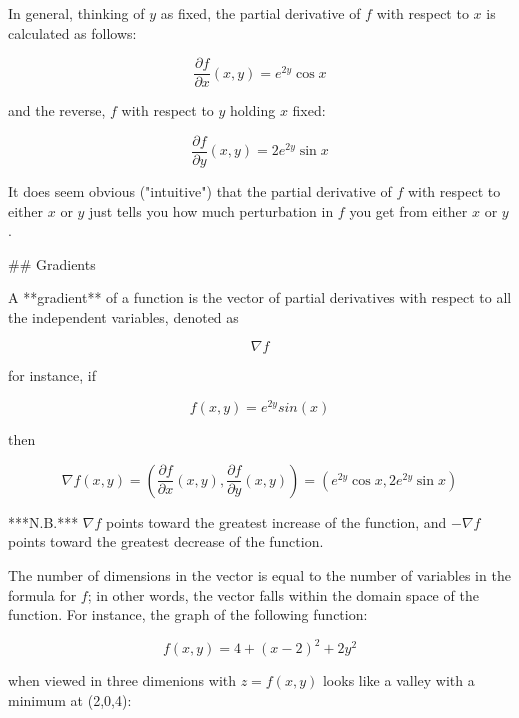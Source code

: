 \begin{markdown}
In general, thinking of $y$ as fixed, the partial derivative of $f$ with respect
to $x$ is calculated as follows:

\begin{equation}
    \frac{\partial f}{\partial x}(x,y) = e^{2y}\cos{x}
\end{equation}

and the reverse, $f$ with respect to $y$ holding $x$ fixed:

\begin{equation}
    \frac{\partial f}{\partial y}(x,y) = 2e^{2y}\sin{x}
\end{equation}

It does seem obvious ("intuitive") that the partial derivative of $f$ with
respect to either $x$ or $y$ just tells you how much perturbation in $f$ you get
from either $x$ or $y$.

## Gradients

A **gradient** of a function is the vector of partial derivatives with respect
to all the independent variables, denoted as

\begin{equation}
    \nabla f
\end{equation}

for instance, if

\begin{equation}
    f(x,y) = e^{2y}sin(x)
\end{equation}

then

\begin{equation}
    \nabla f(x,y) =
    \left( \frac{\partial f}{\partial x}(x,y), \frac{\partial f}{\partial y}(x,y) \right) =
    (e^{2y}\cos{x}, 2e^{2y}\sin{x})
\end{equation}

***N.B.*** $\nabla f$ points toward the greatest increase of the function, and
$-\nabla f$ points toward the greatest decrease of the function.

The number of dimensions in the vector is equal to the number of variables in
the formula for $f$; in other words, the vector falls within the domain space of
the function. For instance, the graph of the following function:

\begin{equation}
    f(x,y) = 4 + (x - 2)^2 + 2y^2
\end{equation}

when viewed in three dimenions with $z = f(x,y)$ looks like a valley with a
minimum at (2,0,4):


\end{markdown}
